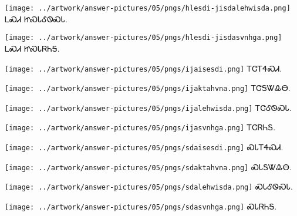 \documentclass[avery5371,frame]{flashcards}%
\begin{document}
\begin{flashcard}{
\texttt{[image: ../artwork/answer-pictures/05/pngs/hlesdi-jisdalehwisda.png]}
}\Huge ᏞᏍᏗ ᏥᏍᏓᎴᏫᏍᏓ.
\end{flashcard}

\begin{flashcard}{
\texttt{[image: ../artwork/answer-pictures/05/pngs/hlesdi-jisdasvnhga.png]}
}\Huge ᏞᏍᏗ ᏥᏍᏓᏒᏂᎦ.
\end{flashcard}

\begin{flashcard}{
\texttt{[image: ../artwork/answer-pictures/05/pngs/ijaisesdi.png]}
}\Huge ᎢᏣᎢᏎᏍᏗ.
\end{flashcard}

\begin{flashcard}{
\texttt{[image: ../artwork/answer-pictures/05/pngs/ijaktahvna.png]}
}\Huge ᎢᏣᎦᏔᎲᎾ.
\end{flashcard}

\begin{flashcard}{
\texttt{[image: ../artwork/answer-pictures/05/pngs/ijalehwisda.png]}
}\Huge ᎢᏣᎴᏫᏍᏓ.
\end{flashcard}

\begin{flashcard}{
\texttt{[image: ../artwork/answer-pictures/05/pngs/ijasvnhga.png]}
}\Huge ᎢᏣᏒᏂᎦ.
\end{flashcard}

\begin{flashcard}{
\texttt{[image: ../artwork/answer-pictures/05/pngs/sdaisesdi.png]}
}\Huge ᏍᏓᎢᏎᏍᏗ.
\end{flashcard}

\begin{flashcard}{
\texttt{[image: ../artwork/answer-pictures/05/pngs/sdaktahvna.png]}
}\Huge ᏍᏓᎦᏔᎲᎾ.
\end{flashcard}

\begin{flashcard}{
\texttt{[image: ../artwork/answer-pictures/05/pngs/sdalehwisda.png]}
}\Huge ᏍᏓᎴᏫᏍᏓ.
\end{flashcard}

\begin{flashcard}{
\texttt{[image: ../artwork/answer-pictures/05/pngs/sdasvnhga.png]}
}\Huge ᏍᏓᏒᏂᎦ.
\end{flashcard}
\end{document}

